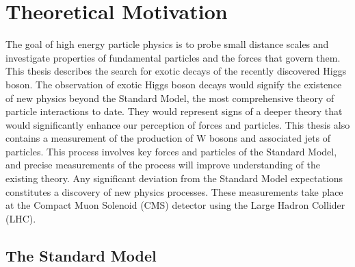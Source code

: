 \documentclass[oneside, letterpaper, oldfontcommands]{memoir}
\begin{document}
\clearpage


\tableofcontents* %
\setcounter{tocdepth}{5}
\setcounter{secnumdepth}{5}
 \clearpage


\makeatletter
     \renewcommand*\l@figure{\@dottedtocline{1}{1em}{3.2em}}
     \renewcommand*\l@table{\@dottedtocline{1}{1em}{3.2em}}
\makeatother
 \listoffigures*  %
 \clearpage
 \listoftables   %

\mainmatter
{}
\chapter{Theoretical Motivation}\label{theory}
\qquad The goal of high energy particle physics is to probe small distance scales and investigate properties of fundamental particles and the forces that govern them. This thesis describes the search for exotic decays of the recently discovered Higgs boson. The observation of exotic Higgs boson decays would signify the existence of new physics beyond the Standard Model, the most comprehensive theory of particle interactions to date. They would represent signs of a deeper theory that would significantly enhance our perception of forces and particles. This thesis also contains a measurement of the production of W bosons and associated jets of particles. This process involves key forces and particles of the Standard Model, and precise measurements of the process will improve understanding of the existing theory. Any significant deviation from the Standard Model expectations constitutes a discovery of new physics processes. These measurements take place at the Compact Muon Solenoid (CMS) detector using the Large Hadron Collider (LHC). 

\section{The Standard Model}\label{sm}
\end{document}
